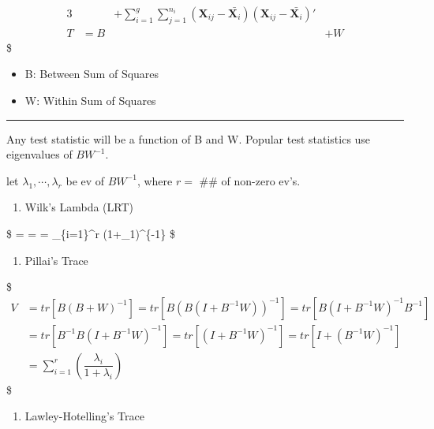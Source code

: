 \documentclass[
]{book}
\providecommand{\tightlist}{%
  \setlength{\itemsep}{0pt}\setlength{\parskip}{0pt}}
\begin{document}
{{\begin{alignat*}{3}
&&+ \sum_{i=1}^g \sum_{j=1}^{n_i} (\pmb X_{ij} - \bar {\pmb X_i})(\pmb X_{ij} - \bar {\pmb X_i})'

\\

T &= B &&+ W



\end{alignat*}
\$

\begin{itemize}
\tightlist
\item
  B: Between Sum of Squares
\item
  W: Within Sum of Squares
\end{itemize}

\begin{center}\rule{0.5\linewidth}{0.5pt}\end{center}

Any test statistic will be a function of B and W. Popular test statistics use eigenvalues of \(BW^{-1}\).

let \(\lambda_1, \cdots, \lambda_r\) be ev of \(BW^{-1}\), where \(r=\) \#\# of non-zero ev's.

\begin{enumerate}
\def\labelenumi{\arabic{enumi}.}
\tightlist
\item
  Wilk's Lambda (LRT)
\end{enumerate}

\$
\Lambda =  =  = \prod\_\{i=1\}\^{}r (1+\lambda\_1)\^{}\{-1\}
\$

\begin{enumerate}
\def\labelenumi{\arabic{enumi}.}
\setcounter{enumi}{1}
\tightlist
\item
  Pillai's Trace
\end{enumerate}

\$
\begin{align*}
V &= tr[B(B+W)^{-1}] =  tr[B(B(I+B^{-1}W))^{-1}] = tr[B(I+B^{-1}W)^{-1}B^{-1}] \\

&=tr[B^{-1}B(I+B^{-1}W)^{-1}] = tr[(I+B^{-1}W)^{-1}] = tr[I+(B^{-1}W)^{-1}]\\

&=\sum_{i=1}^r \left( \dfrac{\lambda_i}{1+\lambda_i}\right)

\end{align*}
\$

\begin{enumerate}
\def\labelenumi{\arabic{enumi}.}
\setcounter{enumi}{2}
\tightlist
\item
  Lawley-Hotelling's Trace
\end{enumerate}

}}
\end{document}
